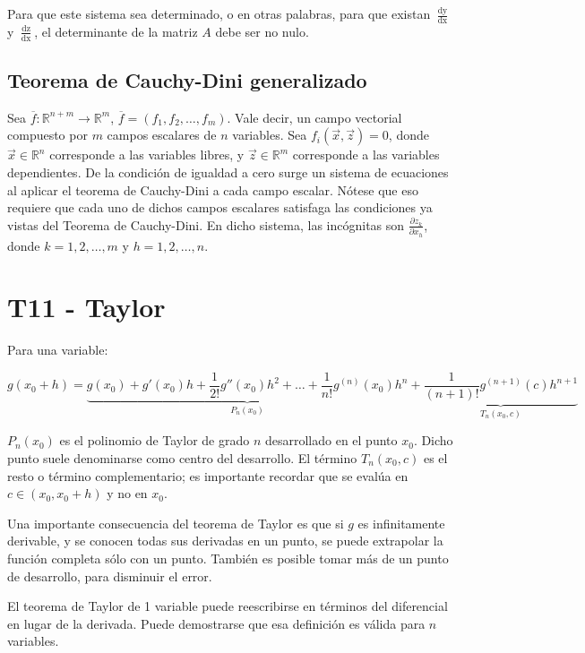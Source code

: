 \documentclass{article}
\renewcommand{\Bbb}{\mathbb}
\begin{document}
Para que este sistema sea determinado, o en otras palabras, para que existan $\frac{\mathop{dy}}{\mathop{dx}}$ y $\frac{\mathop{dz}}{\mathop{dx}}$, el determinante de la matriz $A$ debe ser no nulo.

\subsection{Teorema de Cauchy-Dini generalizado}

Sea $\overline{f}:\Bbb R^{n+m} \rightarrow \Bbb R^m$, $\overline{f} = (f_1, f_2, \ldots, f_m)$. Vale decir, un campo vectorial compuesto por $m$ campos escalares de $n$ variables. Sea $f_i(\overrightarrow{x}, \overrightarrow{z}) = 0$, donde $\overrightarrow{x} \in \Bbb R^n$ corresponde a las variables libres, y $\overrightarrow{z} \in \Bbb R^m$ corresponde a las variables dependientes. De la condición de igualdad a cero surge un sistema de ecuaciones al aplicar el teorema de Cauchy-Dini a cada campo escalar. Nótese que eso requiere que cada uno de dichos campos escalares satisfaga las condiciones ya vistas del Teorema de Cauchy-Dini. En dicho sistema, las incógnitas son $\frac{\partial z_k}{\partial x_h}$, donde $k = 1, 2, \ldots, m$ y $h = 1, 2, \ldots, n$.

\section{T11 - Taylor}

Para una variable:

\begin{equation}
g(x_0 + h) = \underbrace{ g(x_0) + g'(x_0) h + \frac{1}{2!} g''(x_0) h^2 + \ldots + \frac{1}{n!} g^{(n)}(x_0) h^n }_{P_n(x_0)} +  \underbrace{ \frac{1}{(n+1)!} g^{(n+1)}(c) h^{n+1} }_{T_n(x_0, c)}
\end{equation}

$P_n(x_0)$ es el polinomio de Taylor de grado $n$ desarrollado en el punto $x_0$. Dicho punto suele denominarse como centro del desarrollo. El término $T_n(x_0, c)$ es el resto o término complementario; es importante recordar que se evalúa en $c \in (x_0, x_0 + h)$ y no en $x_0$.

Una importante consecuencia del teorema de Taylor es que si $g$ es infinitamente derivable, y se conocen todas sus derivadas en un punto, se puede extrapolar la función completa sólo con un punto. También es posible tomar más de un punto de desarrollo, para disminuir el error.

El teorema de Taylor de 1 variable puede reescribirse en términos del diferencial en lugar de la derivada. Puede demostrarse que esa definición es válida para $n$ variables.
\end{document}
